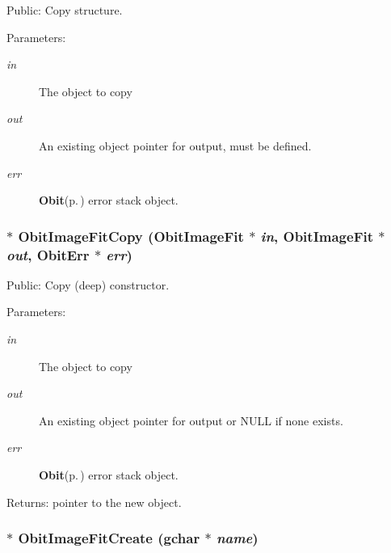 Public: Copy structure. 

\begin{Desc}
\item[Parameters:]
\begin{description}
\item[{\em in}]The object to copy \item[{\em out}]An existing object pointer for output, must be defined. \item[{\em err}]{\bf Obit}{\rm (p.\,\pageref{structObit})} error stack object. \end{description}
\end{Desc}
\subsubsection{$\ast$ Obit\-Image\-Fit\-Copy ({\bf Obit\-Image\-Fit} $\ast$ {\em in}, {\bf Obit\-Image\-Fit} $\ast$ {\em out}, {\bf Obit\-Err} $\ast$ {\em err})}\label{ObitImageFit_8h_a10}


Public: Copy (deep) constructor. 

\begin{Desc}
\item[Parameters:]
\begin{description}
\item[{\em in}]The object to copy \item[{\em out}]An existing object pointer for output or NULL if none exists. \item[{\em err}]{\bf Obit}{\rm (p.\,\pageref{structObit})} error stack object. \end{description}
\end{Desc}
\begin{Desc}
\item[Returns:]pointer to the new object. \end{Desc}
\subsubsection{$\ast$ Obit\-Image\-Fit\-Create (gchar $\ast$ {\em name})}\label{ObitImageFit_8h_a7}



